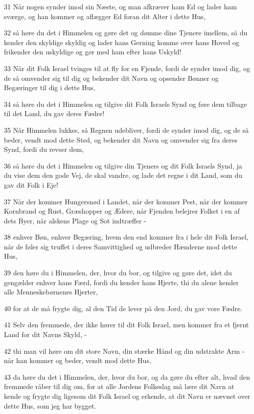 \par 31 Når nogen synder imod sin Næste, og man afkræver ham Ed og lader ham sværge, og han kommer og aflægger Ed foran dit Alter i dette Hus,
\par 32 så høre du det i Himmelen og gøre det og dømme dine Tjenere imellem, så du kender den skyldige skyldig og lader hans Gerning komme over hans Hoved og frikender den uskyldige og gør med ham efter hans Uskyld!
\par 33 Når dit Folk Israel tvinges til at fly for en Fjende, fordi de synder imod dig, og de så omvender sig til dig og bekender dit Navn og opsender Bønner og Begæringer til dig i dette Hus,
\par 34 så høre du det i Himmelen og tilgive dit Folk Israels Synd og føre dem tilbage til det Land, du gav deres Fædre!
\par 35 Når Himmelen lukkes, så Regnen udebliver, fordi de synder imod dig, og de så beder, vendt mod dette Sted, og bekender dit Navn og omvender sig fra deres Synd, fordi du revser dem,
\par 36 så høre du det i Himmelen og tilgive din Tjeners og dit Folk Israels Synd, ja du vise dem den gode Vej, de skal vandre, og lade det regne i dit Land, som du gav dit Folk i Eje!
\par 37 Når der kommer Hungersnød i Landet, når der kommer Pest, når der kommer Kornbrand og Rust, Græshopper og Ædere, når Fjenden belejrer Folket i en af dets Byer, når alskens Plage og Sot indtræffer -
\par 38 enhver Bøn, enhver Begæring, hvem den end kommer fra i hele dit Folk Israel, når de føler sig truffet i deres Samvittighed og udbreder Hænderne mod dette Hus,
\par 39 den høre du i Himmelen, der, hvor du bor, og tilgive og gøre det, idet du gengælder enhver hans Færd, fordi du kender hans Hjerte, thi du alene kender alle Menneskebørnenes Hjerter,
\par 40 for at de må frygte dig, al den Tid de lever på den Jord, du gav vore Fædre.
\par 41 Selv den fremmede, der ikke hører til dit Folk Israel, men kommer fra et fjernt Land for dit Navns Skyld, -
\par 42 thi man vil høre om dit store Navn, din stærke Hånd og din udstrakte Arm - når han kommer og beder, vendt mod dette Hus,
\par 43 da høre du det i Himmelen, der, hvor du bor, og da gøre du efter alt, hvad den fremmede råber til dig om, for at alle Jordens Folkeslag må lære dit Navn at kende og frygte dig ligesom dit Folk Israel og erkende, at dit Navn er nævnet over dette Hus, som jeg har bygget.
